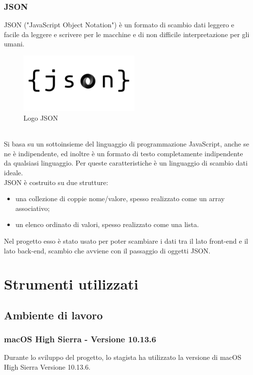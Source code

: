 \subsubsection{JSON}
JSON ("JavaScript Object Notation") è un formato di scambio dati leggero e facile da leggere e scrivere per le macchine e di non difficile interpretazione per gli umani.
\begin{figure}[!h] 
    \centering 
    \includegraphics[width=6cm]{immagini/loghi/json.png}
    \caption{Logo JSON}
\end{figure}
\\
Si basa su un sottoinsieme del linguaggio di programmazione JavaScript, anche se ne è indipendente, ed inoltre è un formato di testo completamente indipendente da qualsiasi linguaggio. Per queste caratteristiche è un linguaggio di scambio dati ideale. 
\\
JSON è costruito su due strutture:
\begin{itemize}
    \item una collezione di coppie nome/valore, spesso realizzato come un array associativo;
    
    \item un elenco ordinato di valori, spesso realizzato come una lista.
\end{itemize}
Nel progetto esso è stato usato per poter scambiare i dati tra il lato front-end e il lato back-end, scambio che avviene con il passaggio di oggetti JSON.

\section{Strumenti utilizzati}
\label{sec:ciclo-vita-software}

\subsection{Ambiente di lavoro}
\subsubsection{macOS High Sierra - Versione 10.13.6}
Durante lo sviluppo del progetto, lo stagista ha utilizzato la versione di macOS High Sierra Versione 10.13.6.

